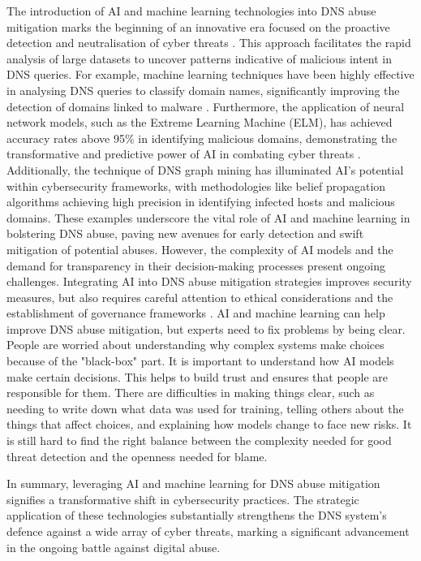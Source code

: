 The introduction of AI and machine learning technologies into DNS abuse mitigation marks the beginning of an innovative era focused on the proactive detection and neutralisation of cyber threats \cite{tariq2023critical}.  This approach facilitates the rapid analysis of large datasets to uncover patterns indicative of malicious intent in DNS queries. For example, machine learning techniques have been highly effective in analysing DNS queries to classify domain names, significantly improving the detection of domains linked to malware \cite{LiMaliciousDomainDetection2020}. Furthermore, the application of neural network models, such as the Extreme Learning Machine (ELM), has achieved accuracy rates above 95\% in identifying malicious domains, demonstrating the transformative and predictive power of AI in combating cyber threats \cite{ZouDNSGraphMining2015}. Additionally, the technique of DNS graph mining has illuminated AI's potential within cybersecurity frameworks, with methodologies like belief propagation algorithms achieving high precision in identifying infected hosts and malicious domains. These examples underscore the vital role of AI and machine learning in bolstering DNS abuse, paving new avenues for early detection and swift mitigation of potential abuses. However, the complexity of AI models and the demand for transparency in their decision-making processes present ongoing challenges. Integrating AI into DNS abuse mitigation strategies improves security measures, but also requires careful attention to ethical considerations and the establishment of governance frameworks \cite{AntonakakisMalwareDomainsUpperDNS2011}. AI and machine learning can help improve DNS abuse mitigation, but experts need to fix problems by being clear. People are worried about understanding why complex systems make choices because of the "black-box" part. It is important to understand how AI models make certain decisions. This helps to build trust and ensures that people are responsible for them. There are difficulties in making things clear, such as needing to write down what data was used for training, telling others about the things that affect choices, and explaining how models change to face new risks. It is still hard to find the right balance between the complexity needed for good threat detection and the openness needed for blame.

In summary, leveraging AI and machine learning for DNS abuse mitigation signifies a transformative shift in cybersecurity practices. The strategic application of these technologies substantially strengthens the DNS system's defence against a wide array of cyber threats, marking a significant advancement in the ongoing battle against digital abuse.

